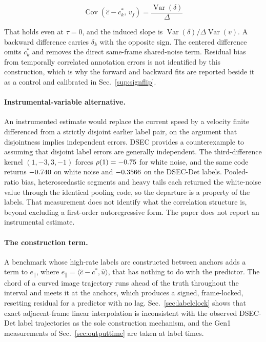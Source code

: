 \documentclass[10pt,twocolumn,letterpaper]{article}
\begin{document}
\begin{equation}
\operatorname{Cov}\!\left(\hat{c}-c^{*}_{k},\,v_{f}\right)=\frac{\operatorname{Var}(\delta)}{\Delta}
\label{eq:shared}
\end{equation}

\noindent That holds even at $\tau=0$, and the induced slope is
$\operatorname{Var}(\delta)/\Delta\operatorname{Var}(v)$. A backward difference
carries $\delta_{k}$ with the opposite sign. The centered difference omits
$c^{*}_{k}$ and removes the direct same-frame shared-noise term. Residual bias
from temporally correlated annotation errors is not identified by this
construction, which is why the forward and backward fits are reported beside it
as a control and calibrated in Sec.~\ref{sup:signflip}.

\paragraph{Instrumental-variable alternative.} An instrumented
estimate would replace the current speed by a velocity finite differenced from a
strictly disjoint earlier label pair, on the argument that disjointness implies
independent errors. DSEC provides a counterexample to assuming that disjoint
label errors are generally independent. The third-difference kernel $(1,-3,3,-1)$ forces
$\rho(1)=-0.75$ for white noise, and the same code returns
$-0.740$ on white noise and $-0.3566$ on the DSEC-Det labels.
Pooled-ratio bias, heteroscedastic segments and heavy tails each returned the
white-noise value through the identical pooling code, so the departure is a
property of the labels. That measurement does not identify what the correlation
structure is, beyond excluding a first-order autoregressive form. The paper does
not report an instrumental estimate.

\paragraph{The construction term.} A benchmark whose high-rate labels are
constructed between anchors adds a term to $e_{\parallel}$, where
$e_{\parallel}=\langle\hat c-c^{*},\hat u\rangle$, that has nothing to do
with the predictor. The chord of a curved image trajectory runs ahead of the
truth throughout the interval and meets it at the anchors, which produces a
signed, frame-locked, resetting residual for a predictor with no lag. Sec.~\ref{sec:labelclock} shows that exact adjacent-frame linear interpolation is inconsistent
with the observed DSEC-Det label trajectories as the sole construction mechanism,
and the Gen1 measurements of Sec.~\ref{sec:outputtime} are taken at label times.
\end{document}
